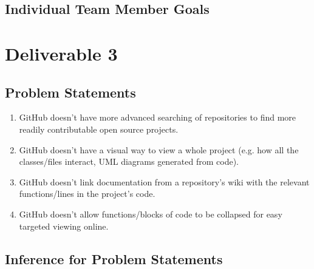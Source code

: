 \documentclass[12pt]{article}
\begin{document}
\subsection{Individual Team Member Goals}

\pagebreak
\setcounter{section}{3}
\setcounter{subsection}{0}
\section*{Deliverable 3}
\subsection{Problem Statements}
\begin{enumerate}
\item GitHub doesn't have more advanced searching of repositories to find more readily contributable open source projects.
\item GitHub doesn't have a visual way to view a whole project (e.g. how all the classes/files interact, UML diagrams generated from code).
\item GitHub doesn't link documentation from a repository's wiki with the relevant functions/lines in the project's code.
\item GitHub doesn't allow functions/blocks of code to be collapsed for easy targeted viewing online.
\end{enumerate}
\subsection{Inference for Problem Statements}
\end{document}
